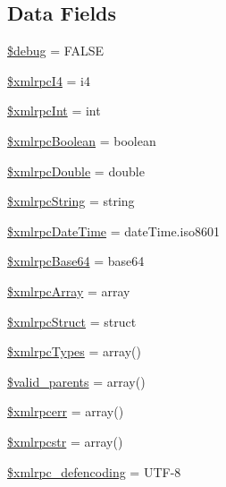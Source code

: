 \subsection*{Data Fields}
\begin{DoxyCompactItemize}
\item 
\hyperlink{class_c_i___xmlrpc_a85ae3e64cd40e9564adceb010085e9dd}{\$debug} = F\+A\+L\+S\+E
\item 
\hyperlink{class_c_i___xmlrpc_a4d41d61a02c60406c56254f0988b8141}{\$xmlrpc\+I4} = \textquotesingle{}i4\textquotesingle{}
\item 
\hyperlink{class_c_i___xmlrpc_a1bf451bf41226cf1702f54fa46b041f2}{\$xmlrpc\+Int} = \textquotesingle{}int\textquotesingle{}
\item 
\hyperlink{class_c_i___xmlrpc_abb241cb9cac2595c7ef28106808ec438}{\$xmlrpc\+Boolean} = \textquotesingle{}boolean\textquotesingle{}
\item 
\hyperlink{class_c_i___xmlrpc_aa412c6bea7572d0e508b5ef9d2213db3}{\$xmlrpc\+Double} = \textquotesingle{}double\textquotesingle{}
\item 
\hyperlink{class_c_i___xmlrpc_a69f8b2c87014597d1f5509ec934ceeea}{\$xmlrpc\+String} = \textquotesingle{}string\textquotesingle{}
\item 
\hyperlink{class_c_i___xmlrpc_ad0ef2c8353643b73afe4636a5fb84cff}{\$xmlrpc\+Date\+Time} = \textquotesingle{}date\+Time.\+iso8601\textquotesingle{}
\item 
\hyperlink{class_c_i___xmlrpc_a95dc3164d1c3e1fdaf7185095fb376ae}{\$xmlrpc\+Base64} = \textquotesingle{}base64\textquotesingle{}
\item 
\hyperlink{class_c_i___xmlrpc_aedecd71f2438e9a44a8f5a1dc73f4c7a}{\$xmlrpc\+Array} = \textquotesingle{}array\textquotesingle{}
\item 
\hyperlink{class_c_i___xmlrpc_a9a499285050ed5c867eec71854231f01}{\$xmlrpc\+Struct} = \textquotesingle{}struct\textquotesingle{}
\item 
\hyperlink{class_c_i___xmlrpc_a2b937e1ca5ee8495f0251a74222cec64}{\$xmlrpc\+Types} = array()
\item 
\hyperlink{class_c_i___xmlrpc_a801945a338a9dee5f723c00cb71657b7}{\$valid\+\_\+parents} = array()
\item 
\hyperlink{class_c_i___xmlrpc_a915a90a791db11a94f665567d2f5ad01}{\$xmlrpcerr} = array()
\item 
\hyperlink{class_c_i___xmlrpc_a89bbdd6a565dd3af2378b44fc5f156a0}{\$xmlrpcstr} = array()
\item 
\hyperlink{class_c_i___xmlrpc_a7a31af447cebbb81b1f3c5581cd90d5a}{\$xmlrpc\+\_\+defencoding} = \textquotesingle{}U\+T\+F-\/8\textquotesingle{}

\end{DoxyCompactItemize}
